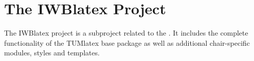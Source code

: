 \section{The IWBlatex Project}%
\label{sec:Introduction_IWBlatexProject}%
The IWBlatex project is a subproject related to the \IWBlangChair. It includes the complete functionality of the TUMlatex base package as well as additional chair-specific modules, styles and templates.\par%
%
%
